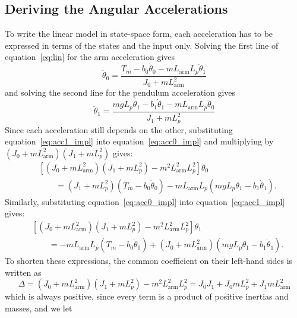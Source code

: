 \documentclass[a4paper,11pt]{article}
\newcommand{\La}{L_{\mathrm{arm}}}
\begin{document}
\subsection{Deriving the Angular Accelerations}
To write the linear model in state-space form, each acceleration has to be expressed in terms of the states and the input only. Solving the first line of equation~\ref{eq:lin} for the arm acceleration gives
\begin{equation}
  \ddot\theta_0 = \frac{T_m - b_0 \dot\theta_0 - m \La L_p \ddot\theta_1}{J_0 + m \La^2}
  \label{eq:acc0_impl}
\end{equation}
and solving the second line for the pendulum acceleration gives
\begin{equation}
  \ddot\theta_1 = \frac{m g L_p \theta_1 - b_1 \dot\theta_1 - m \La L_p \ddot\theta_0}{J_1 + m L_p^2}
  \label{eq:acc1_impl}
\end{equation}
Since each acceleration still depends on the other, substituting equation~\ref{eq:acc1_impl} into equation~\ref{eq:acc0_impl} and multiplying by $\left(J_0 + m \La^2\right)\left(J_1 + m L_p^2\right)$ gives:
\begin{equation}
\begin{aligned}
  & \left[\left(J_0 + m \La^2\right)\left(J_1 + m L_p^2\right) - m^2 \La^2 L_p^2\right]\ddot\theta_0\\
  & \qquad = \left(J_1 + m L_p^2\right)\left(T_m - b_0 \dot\theta_0\right) - m \La L_p \left(m g L_p \theta_1 - b_1 \dot\theta_1\right).
\end{aligned}
\end{equation}
Similarly, substituting equation~\ref{eq:acc0_impl} into equation~\ref{eq:acc1_impl} gives:
\begin{equation}
\begin{aligned}
  & \left[\left(J_0 + m \La^2\right)\left(J_1 + m L_p^2\right) - m^2 \La^2 L_p^2\right]\ddot\theta_1\\
  & \qquad = -m \La L_p \left(T_m - b_0 \dot\theta_0\right) + \left(J_0 + m \La^2\right)\left(m g L_p \theta_1 - b_1 \dot\theta_1\right).
\end{aligned}
\end{equation}
To shorten these expressions, the common coefficient on their left-hand sides is written as
\begin{equation}
  \Delta = \left(J_0 + m \La^2\right)\left(J_1 + m L_p^2\right) - m^2 \La^2 L_p^2 = J_0 J_1 + J_0 m L_p^2 + J_1 m \La^2
  \label{eq:Delta}
\end{equation}
which is always positive, since every term is a product of positive inertias and masses, and we let
\end{document}
